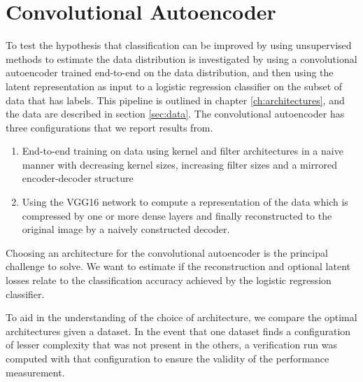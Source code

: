 \section{Convolutional Autoencoder}

To test the hypothesis that classification can be improved by using unsupervised methods to estimate the data distribution is investigated by using a convolutional autoencoder trained end-to-end on the data distribution, and then using the latent representation as input to a logistic regression classifier on the subset of data that has labels. This pipeline is outlined in chapter \ref{ch:architectures}, and the data are described in section \ref{sec:data}. The convolutional autoencoder has three configurations that we report results from. 
\begin{enumerate}[start=0, label={(\bfseries Ar\arabic*):}, ref={(Ar\arabic*)}]
	\item \label{item:clf_no_vgg} End-to-end training on data using kernel and filter architectures in a naive manner with decreasing kernel sizes, increasing filter sizes and a mirrored encoder-decoder structure
	\item \label{item:clf_freeze_vgg} Using the VGG16 network to compute a representation of the data which is compressed by one or more dense layers and finally reconstructed to the original image by a naively constructed decoder. 
\end{enumerate}

\noindent Choosing an architecture for the convolutional autoencoder is the principal challenge to solve. We want to estimate if the reconstruction and optional latent losses relate to the classification accuracy achieved by the logistic regression classifier.

To aid in the understanding of the choice of architecture, we compare the optimal architectures given a dataset. In the event that one dataset finds a configuration of lesser complexity that was not present in the others, a verification run was computed with that configuration to ensure the validity of the performance measurement.

